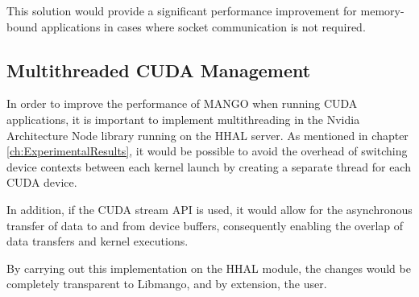 This solution would provide a significant performance improvement for memory-bound applications in cases where socket communication is not required.

\subsection{Multithreaded CUDA Management}

In order to improve the performance of MANGO when running CUDA applications, it is important to implement multithreading in the Nvidia Architecture Node library running on the HHAL server. As mentioned in chapter \ref{ch:ExperimentalResults}, it would be possible to avoid the overhead of switching device contexts between each kernel launch by creating a separate thread for each CUDA device. 

In addition, if the CUDA stream API is used, it would allow for the asynchronous transfer of data to and from device buffers, consequently enabling the overlap of data transfers and kernel executions. 

By carrying out this implementation on the HHAL module, the changes would be completely transparent to Libmango, and by extension, the user.
